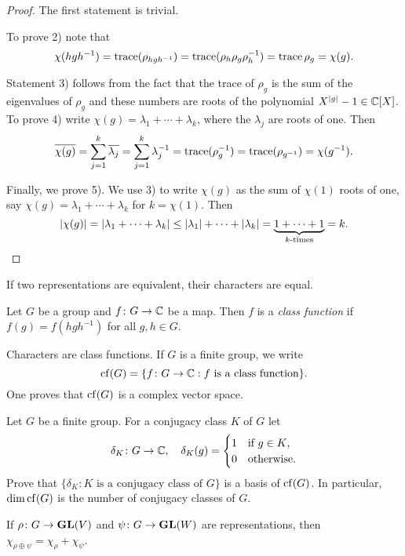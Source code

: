 \begin{proof}
	The first statement is trivial. 	
    
    To prove 2) note that
	\[
	\chi(hgh^{-1})=\operatorname{trace}(\rho_{hgh^{-1}})=\operatorname{trace}(\rho_h\rho_g\rho_h^{-1})=\operatorname{trace}\rho_g=\chi(g).
	\]
    
	Statement 3) follows from the fact that the trace of $\rho_g$ is the sum
	of the eigenvalues of $\rho_g$ and these numbers are roots of the polynomial
	$X^{|g|}-1\in\mathbb{C}[X]$. To prove 4) write $\chi(g)=\lambda_1+\cdots+\lambda_k$, where 
	the $\lambda_j$ are roots of one. Then
	\[
	\overline{\chi(g)}=\sum^k_{j=1}\overline{\lambda_j}
	=\sum_{j=1}^k\lambda_j^{-1}
	=\operatorname{trace}(\rho_g^{-1})
	=\operatorname{trace}(\rho_{g^{-1}})
	=\chi(g^{-1}).
	\] 
    
	Finally, we prove 5). We use 3) to write $\chi(g)$ as the sum of
	$\chi(1)$ roots of one, say $\chi(g)=\lambda_1+\cdots+\lambda_k$ for
	$k=\chi(1)$. Then 
	\[
	|\chi(g)|=|\lambda_1+\cdots+\lambda_k|\leq |\lambda_1|+\cdots+|\lambda_k|
	=\underbrace{1+\cdots+1}_{\text{$k$-times}}=k.\qedhere
	\]
\end{proof}

If two representations are equivalent, their characters are equal.

\begin{definition}
	Let $G$ be a group and 
	$f\colon G\to\mathbb{C}$ be a map. Then $f$ is a \emph{class function} if
	$f(g)=f(hgh^{-1})$ for all $g,h\in G$. 	
\end{definition}

Characters are class functions. If $G$ is a finite group, 
we write 
\[
\operatorname{cf}(G)=\{f\colon G\to\mathbb{C}:f\text{ is a class function}\}.
\]
One proves that $\operatorname{cf}(G)$ is a complex vector space. 

\begin{exercise}
    Let $G$ be a finite group. For a conjugacy class $K$ of $G$
    let 
    \[
    \delta_K\colon G\to\mathbb{C},
    \quad
    \delta_K(g)=\begin{cases}
        1 & \text{if $g\in K$,}\\
        0 & \text{otherwise}.
        \end{cases}
    \]
    Prove that $\{\delta_K:K\text{ is a conjugacy class of $G$}\}$ is a basis of $\operatorname{cf}(G)$. 
    In particular, $\dim\operatorname{cf}(G)$ is the number of conjugacy classes of $G$. 
\end{exercise}

\begin{proposition}
    If $\rho\colon G\to\mathbf{GL}(V)$ and
    $\psi\colon G\to\mathbf{GL}(W)$ are representations, then
    $\chi_{\rho\oplus\psi}=\chi_\rho+\chi_\psi$.
\end{proposition}

